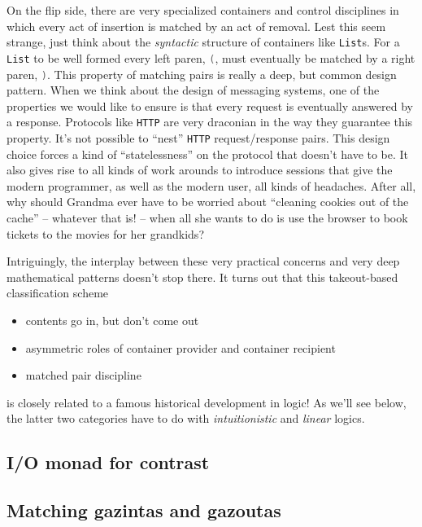 On the flip side, there are very specialized containers and control
disciplines in which every act of insertion is matched by an act of
removal. Lest this seem strange, just think about the \emph{syntactic}
structure of containers like
\lstinline[language=Scala,mathescape=true]!List!s. For a
\lstinline[language=Scala,mathescape=true]!List! to be well formed
every left paren, \lstinline[language=Scala,mathescape=true]!(!, must
eventually be matched by a right paren,
\lstinline[language=Scala,mathescape=true]!)!. This property of
matching pairs is really a deep, but common design pattern. When we
think about the design of messaging systems, one of the properties we
would like to ensure is that every request is eventually answered by a
response. Protocols like \texttt{HTTP} are very draconian in the way
they guarantee this property. It's not possible to ``nest''
\texttt{HTTP} request/response pairs. This design choice forces a kind
of ``statelessness'' on the protocol that doesn't have to be. It also
gives rise to all kinds of work arounds to introduce sessions that
give the modern programmer, as well as the modern user, all kinds of
headaches. After all, why should Grandma ever have to be worried about
``cleaning cookies out of the cache'' -- whatever that is! -- when all
she wants to do is use the browser to book tickets to the movies for
her grandkids?

Intriguingly, the interplay between these very practical concerns and
very deep mathematical patterns doesn't stop there. It turns out that
this takeout-based classification scheme

\begin{itemize}
  \item contents go in, but don't come out
  \item asymmetric roles of container provider and container recipient
  \item matched pair discipline
\end{itemize}

is closely related to a famous historical development in logic! As
we'll see below, the latter two categories have to do with
\emph{intuitionistic} and \emph{linear} logics.

\subsection{I/O monad for contrast}

\subsection{Matching gazintas and gazoutas}

